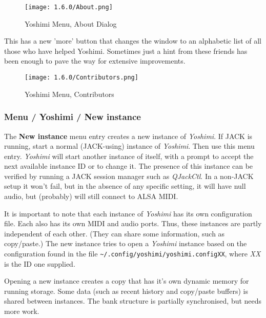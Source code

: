 \begin{figure}[H]
   \centering
   \texttt{[image: 1.6.0/About.png]}
   \caption{Yoshimi Menu, About Dialog}
   \label{fig:yoshimi_about_dialog}
\end{figure}
    This has a new 'more' button that changes the window to an alphabetic list of
    all those who have helped Yoshimi. Sometimes just a hint from these friends
    has been enough to pave the way for extensive improvements.
\begin{figure}[H]
   \centering
   \texttt{[image: 1.6.0/Contributors.png]}
   \caption{Yoshimi Menu, Contributors}
   \label{fig:yoshimi_contributors}
\end{figure}

\subsubsection{Menu / Yoshimi / New instance}
\label{subsubsec:menu_yoshimi_new_instance}

   The \textbf{New instance} menu entry creates a new instance of
   \textsl{Yoshimi}.  If JACK is running, start a normal (JACK-using) instance
   of \textsl{Yoshimi}.  Then use this menu entry.  \textsl{Yoshimi} will start
   another instance of itself, with a prompt to accept the next available
   instance ID or to change it.  The presence of this instance can be verified
   by running a JACK session manager such as \textsl{QJackCtl}.
   In a non-JACK setup it won't fail, but in the absence of any specific
   setting, it will have null audio, but (probably) will still connect to ALSA
   MIDI.

   It is important to note that each instance of \textsl{Yoshimi} has its
   own configuration file.  Each also has its own MIDI and audio ports.
   Thus, these instances are partly independent of each other.
   (They can share some information, such as copy/paste.)
   The new instance tries to open a \textsl{Yoshimi} instance based on the
   configuration found in the file
   \texttt{\textasciitilde/.config/\-yoshimi/\-yoshimi.configXX}, where
   \textsl{XX} is the ID one supplied.

   Opening a new instance creates a copy that has it's own dynamic memory for
   running storage. Some data (such as recent history and copy/paste buffers) is
   shared between instances.
   The bank structure is partially synchronised, but needs more work.

